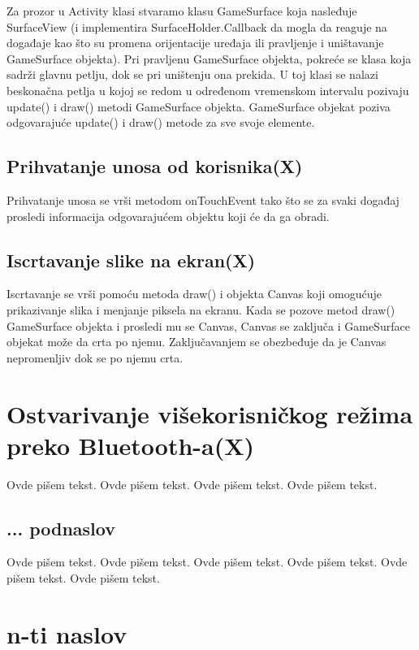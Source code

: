\documentclass[a4paper]{article}
\begin{document}
{Za prozor u Activity klasi stvaramo klasu GameSurface koja nasleđuje SurfaceView (i implementira SurfaceHolder.Callback da mogla da reaguje na događaje kao što su promena orijentacije uređaja ili pravljenje i uništavanje GameSurface objekta). Pri pravljenu GameSurface objekta, pokreće se klasa koja sadrži glavnu petlju, dok se pri uništenju ona prekida. U toj klasi se nalazi beskonačna petlja u kojoj se redom u određenom vremenskom intervalu pozivaju update() i draw() metodi GameSurface objekta. GameSurface objekat poziva odgovarajuće update() i draw() metode za sve svoje elemente.


\subsection{Prihvatanje unosa od korisnika(X)}
\label{subsec:podnaslov1}

Prihvatanje unosa se vrši metodom onTouchEvent tako što se za svaki događaj prosledi informacija odgovarajućem objektu koji će da ga obradi.

\subsection{Iscrtavanje slike na ekran(X)}
\label{subsec:podnaslov2}

Iscrtavanje se vrši pomoću metoda draw() i objekta Canvas koji omogućuje prikazivanje slika i menjanje piksela na ekranu. Kada se pozove metod draw() GameSurface objekta i prosledi mu se Canvas, Canvas se zaključa i GameSurface objekat može da crta po njemu. Zaključavanjem se obezbeđuje da je Canvas nepromenljiv dok se po njemu crta.

\section{Ostvarivanje višekorisničkog režima preko Bluetooth-a(X)}
\label{sec:naslov2}

Ovde pišem tekst. 
Ovde pišem tekst. 
Ovde pišem tekst. 
Ovde pišem tekst. 

\subsection{... podnaslov}
\label{subsec:podnaslovN}

Ovde pišem tekst. 
Ovde pišem tekst. 
Ovde pišem tekst. 
Ovde pišem tekst. 
Ovde pišem tekst. 
Ovde pišem tekst. 

\section{n-ti naslov}
\label{sec:naslovN}

}
\end{document}

